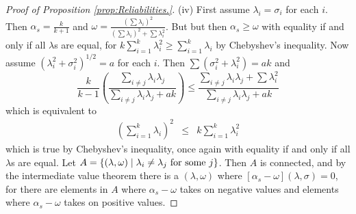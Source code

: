 \documentclass[twoside]{article}
\renewcommand{\sqrt}[1]{{(#1)^{1/2}}}
\begin{document}
\begin{proof}[Proof of Proposition \ref{prop:Reliabilities.}]
(iv) First assume $\lambda_{i}=\sigma_{i}$ for each $i$. Then $\alpha_{s}=\frac{k}{k+1}$
and $\omega=\frac{\left(\sum\lambda_{i}\right)^{2}}{\left(\sum\lambda_{i}\right)^{2}+\sum\lambda_{i}^{2}}$.
But but then $\alpha_{s}\geq\omega$ with equality if and only if
all $\lambda$s are equal, for $k\sum_{i=1}^{k}\lambda_{i}^{2}\geq\sum_{i=1}^{k}\lambda_{i}$
by Chebyshev's inequality. Now assume $\sqrt{\lambda_{i}^{2}+\sigma_{i}^{2}}=a$
for each $i$. Then $\sum\left(\sigma_{i}^{2}+\lambda_{i}^{2}\right)=ak$
and
\[
\frac{k}{k-1}\left(\frac{\sum_{i\neq j}\lambda_{i}\lambda_{j}}{\sum_{i\neq j}\lambda_{i}\lambda_{j}+ak}\right)\leq\frac{\sum_{i\neq j}\lambda_{i}\lambda_{j}+\sum\lambda_{i}^{2}}{\sum_{i\neq j}\lambda_{i}\lambda_{j}+ak}
\]
which is equivalent to
\begin{eqnarray*}
\left(\sum_{i=1}^{k}\lambda_{i}\right)^{2} & \leq & k\sum_{i=1}^{k}\lambda_{i}^{2}
\end{eqnarray*}
which is true by Chebyshev's inequality, once again with equality
if and only if all $\lambda$s are equal. Let $A=\left\{ \left(\lambda,\omega\right)\mid\lambda_{i}\neq\lambda_{j}\text{\textrm{ for some }}j\right\} $.
Then $A$ is connected, and by the intermediate value theorem there
is a $\left(\lambda,\omega\right)$ where $\left[\alpha_{s}-\omega\right]\left(\lambda,\sigma\right)=0$,
for there are elements in $A$ where $\alpha_{s}-\omega$ takes on
negative values and elements where $\alpha_{s}-\omega$ takes on positive
values.
\end{proof}
\end{document}
